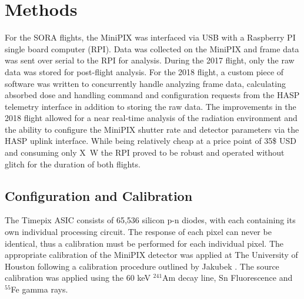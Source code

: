 \section{Methods}
\label{Methods}
For the SORA flights, the MiniPIX was interfaced via USB with a Raspberry PI single board computer (RPI). Data was collected on the MiniPIX and frame data was sent over serial to the RPI for analysis. During the 2017 flight, only the raw data was stored for post-flight analysis. For the 2018 flight, a custom piece of software was written to concurrently handle analyzing frame data, calculating absorbed dose and handling command and configuration requests from the HASP telemetry interface in addition to storing the raw data. The improvements in the 2018 flight allowed for a near real-time analysis of the radiation environment and the ability to configure the MiniPIX shutter rate and detector parameters via the HASP uplink interface. While being relatively cheap at a price point of 35\$ USD and consuming only \SI{X}{\watt} the RPI proved to be robust and operated without glitch for the duration of both flights.



\subsection{Configuration and Calibration}
The Timepix ASIC consists of 65,536 silicon p-n diodes, with each containing its own individual processing circuit. The response of each pixel can never be identical, thus a calibration must be performed for each individual pixel. The appropriate calibration of the MiniPIX detector was applied at The University of Houston following a calibration procedure outlined by Jakubek \cite{mpjakubek}. The source calibration was applied using the 60 keV $^{241}$Am decay line, Sn Fluorescence and $^{55}$Fe gamma rays.

